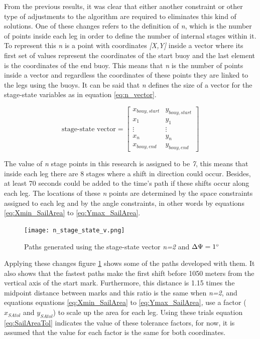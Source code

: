 From the previous results, it was clear that either another constraint or other type of adjustments to the algorithm are required to eliminates this kind of solutions. One of these changes refers to the definition of \textit{n}, which is the number of points inside each leg in order to define the number of internal stages within it. To represent this \textit{n} is a point with coordinates \textit{[X,Y]} inside a vector where its first set of values represent the coordinates of the start buoy and the last element is the coordinates of the end buoy. This means that \textit{n} is the number of points inside a vector and regardless the coordinates of these points they are linked to the legs using the buoys. It can be said that \textit{n} defines the size of a vector for the stage-state variables as in equation \ref{eq:n_vector}. \par
\begin{equation} \label{eq:n_vector}
\textrm{stage-state vector} = 
    \begin{bmatrix}
        x_{bouy,start} & y_{bouy,start} \\ 
        x_{1} & y_{1} \\
        \vdots & \vdots\\
        x_{n} & y_{n} \\
        x_{bouy,end} & y_{bouy,end} 
    \end{bmatrix}
\end{equation}

The value of \textit{n} stage points in this research is assigned to be \textit{7}, this means that inside each leg there are 8 stages where a shift in direction could occur. Besides, at least 70 seconds could be added to the time's path if these shifts occur along each leg. The locations of these \textit{n} points are determined by the space constraints assigned to each leg and by the angle constraints, in other words by equations \ref{eq:Xmin_SailArea} to \ref{eq:Ymax_SailArea}. \par 

\begin{figure}[hbt!]
    \centering
    \texttt{[image: n\_stage\_state\_v.png]}
    \caption{Paths generated using the stage-state vector \textit{n=2} and $\Delta \Psi =1\degree$}
    \label{fig:n_stage_state_vector_paths}
\end{figure}

Applying these changes figure \ref{fig:n_stage_state_vector_paths} shows some of the paths developed with them. It also shows that the fastest paths make the first shift before 1050 meters from the vertical axis of the start mark. Furthermore, this distance is 1.15 times the midpoint distance between marks and this ratio is the same when \textit{n=2}, and equations equations \ref{eq:Xmin_SailArea} to \ref{eq:Ymax_SailArea}, use a factor ($x_{SAtol}$ and  $y_{SAtol}$) to scale up the area for each leg. Using these trials  %
equation \ref{eq:SailAreaTol} indicates the value of these tolerance factors, for now, it is assumed that the value for each factor is the same for both coordinates. \par

